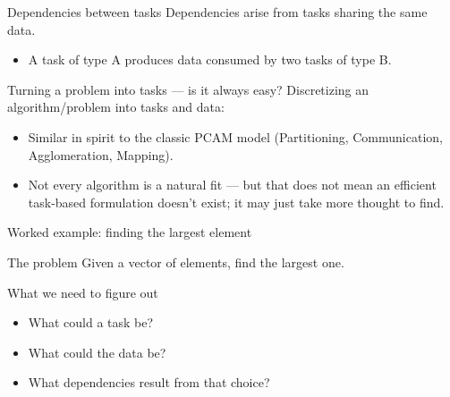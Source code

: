 \documentclass[presentation, aspectratio=169]{beamer}
\begin{document}
\begin{frame}[label={sec:org38d9375}]{Dependencies between tasks}
Dependencies arise from tasks \alert{sharing the same data}.
\begin{itemize}
\item A task of type A produces data consumed by two tasks of type B.
\end{itemize}

\begin{center}
\end{center}
\end{frame}
\begin{frame}[label={sec:orgfbff9f8}]{Turning a problem into tasks — is it always easy?}
Discretizing an algorithm/problem into tasks and data:
\begin{itemize}
\item Similar in spirit to the classic PCAM model (Partitioning,
Communication, Agglomeration, Mapping).
\item Not every algorithm is a natural fit — but that does not mean an
efficient task-based formulation doesn't exist; it may just take
more thought to find.
\end{itemize}
\end{frame}
\begin{frame}[label={sec:orge9a25ee}]{Worked example: finding the largest element}
\begin{block}{The problem}
Given a vector of elements, find the largest one.
\end{block}
\begin{block}{What we need to figure out}
\begin{itemize}
\item What could a \alert{task} be?
\item What could the \alert{data} be?
\item What \alert{dependencies} result from that choice?
\end{itemize}
\end{block}
\end{frame}
\end{document}
